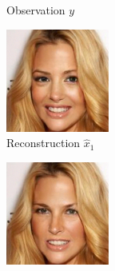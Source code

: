 \begin{figure}
\begin{subfigure}{.135\textwidth}
        \caption{\scriptsize Observation $y$}
    \end{subfigure}
    \begin{subfigure}{.135\textwidth}
        \includegraphics[width=\textwidth]{Chapter2/samples/diversity/1.png}
        \caption{\scriptsize Reconstruction $\hat{x}_1$}
    \end{subfigure} 
    \begin{subfigure}{.135\textwidth}
        \includegraphics[width=\textwidth]{Chapter2/samples/diversity/2.png}

\end{subfigure}
\end{figure}
